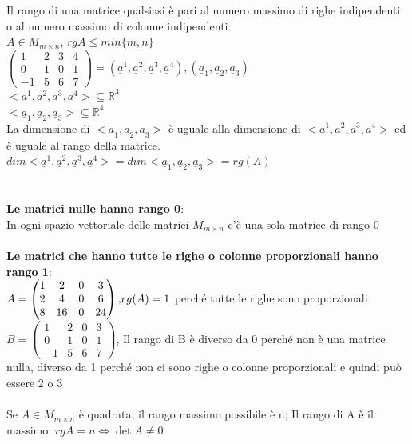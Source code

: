 Il rango di una matrice qualsiasi è pari al numero massimo di righe
indipendenti o al numero massimo di colonne indipendenti.\\
$A\in M_{m\times n}$, $rgA\leqslant min\{m,n\}$\\
$
\begin{pmatrix}
  1 & 2 & 3 & 4\\
  0 & 1 & 0 & 1\\
  -1 & 5 & 6 & 7
\end{pmatrix}=(\underline{a}^1, \underline{a}^2, \underline{a}^3,
\underline{a}^4), (\underline{a}_1,\underline{a}_2,\underline{a}_3)$\\
$<\underline{a}^1, \underline{a}^2, \underline{a}^3,
\underline{a}^4>\subseteq\mathbb{R}^3$\\
$<\underline{a}_1,\underline{a}_2,\underline{a}_3>\subseteq\mathbb{R}^4$\\
La dimensione di $<\underline{a}_1,\underline{a}_2,\underline{a}_3>$
è uguale alla dimensione di $<\underline{a}^1, \underline{a}^2,
\underline{a}^3, \underline{a}^4>$ ed è uguale al rango della matrice.\\
$dim<\underline{a}^1, \underline{a}^2, \underline{a}^3,
\underline{a}^4>=dim<\underline{a}_1,\underline{a}_2,\underline{a}_3>=rg(A)$\\\\\\
\textbf{Le matrici nulle hanno rango 0}:\\
In ogni spazio vettoriale delle matrici $M_{m\times n}$ c'è una sola
matrice di rango 0\\\\
\textbf{Le matrici che hanno tutte le righe o colonne proporzionali hanno rango 1}:\\
$A=
\begin{pmatrix}
  1 & 2 & 0 & 3\\
  2 & 4 & 0 & 6\\
  8 & 16 & 0 & 24
\end{pmatrix}\textnormal{,} rg(A)=1$ perché tutte le righe sono proporzionali\\
$B=
\begin{pmatrix}
  1 & 2 & 0 & 3\\
  0 & 1 & 0 & 1\\
  -1 & 5 & 6 & 7
\end{pmatrix}$, Il rango di B è diverso da 0 perché non è una matrice
nulla, diverso da 1 perché non ci sono righe o colonne proporzionali
e quindi può essere 2 o 3\\\\
Se $A\in M_{m\times n}$ è quadrata, il rango massimo possibile è n;
Il rango di A è il massimo: $rgA=n\Leftrightarrow \det A\neq 0$

